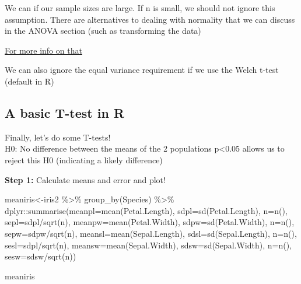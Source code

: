\documentclass[
  letterpaper,
  DIV=11,
  numbers=noendperiod]{scrartcl}
\newenvironment{Shaded}{\begin{snugshade}}{\end{snugshade}}
\newcommand{\AttributeTok}[1]{\textcolor[rgb]{0.40,0.45,0.13}{#1}}
\newcommand{\FunctionTok}[1]{\textcolor[rgb]{0.28,0.35,0.67}{#1}}
\newcommand{\NormalTok}[1]{\textcolor[rgb]{0.00,0.23,0.31}{#1}}
\newcommand{\OtherTok}[1]{\textcolor[rgb]{0.00,0.23,0.31}{#1}}
\newcommand{\SpecialCharTok}[1]{\textcolor[rgb]{0.37,0.37,0.37}{#1}}
\begin{document}
We can if our sample sizes are large. If n is small, we should not
ignore this assumption. There are alternatives to dealing with normality
that we can discuss in the ANOVA section (such as transforming the data)

\href{https://thestatsgeek.com/2013/09/28/the-t-test-and-robustness-to-non-normality/}{For
more info on that}

We can also ignore the equal variance requirement if we use the Welch
t-test (default in R)\\

\hypertarget{a-basic-t-test-in-r}{%
\subsection{\texorpdfstring{\textbf{A basic T-test in
R}}{A basic T-test in R}}\label{a-basic-t-test-in-r}}

Finally, let's do some T-tests!\\

H0: No difference between the means of the 2 populations p\textless0.05
allows us to reject this H0 (indicating a likely difference)

\textbf{Step 1:} Calculate means and error and plot!

\begin{Shaded}
\begin{Highlighting}[]
\NormalTok{meaniris}\OtherTok{\textless{}{-}}\NormalTok{iris2 }\SpecialCharTok{\%\textgreater{}\%}
  \FunctionTok{group\_by}\NormalTok{(Species) }\SpecialCharTok{\%\textgreater{}\%}
\NormalTok{  dplyr}\SpecialCharTok{::}\FunctionTok{summarise}\NormalTok{(}\AttributeTok{meanpl=}\FunctionTok{mean}\NormalTok{(Petal.Length), }\AttributeTok{sdpl=}\FunctionTok{sd}\NormalTok{(Petal.Length), }\AttributeTok{n=}\FunctionTok{n}\NormalTok{(), }\AttributeTok{sepl=}\NormalTok{sdpl}\SpecialCharTok{/}\FunctionTok{sqrt}\NormalTok{(n), }\AttributeTok{meanpw=}\FunctionTok{mean}\NormalTok{(Petal.Width), }\AttributeTok{sdpw=}\FunctionTok{sd}\NormalTok{(Petal.Width), }\AttributeTok{n=}\FunctionTok{n}\NormalTok{(), }\AttributeTok{sepw=}\NormalTok{sdpw}\SpecialCharTok{/}\FunctionTok{sqrt}\NormalTok{(n), }\AttributeTok{meansl=}\FunctionTok{mean}\NormalTok{(Sepal.Length), }\AttributeTok{sdsl=}\FunctionTok{sd}\NormalTok{(Sepal.Length), }\AttributeTok{n=}\FunctionTok{n}\NormalTok{(), }\AttributeTok{sesl=}\NormalTok{sdpl}\SpecialCharTok{/}\FunctionTok{sqrt}\NormalTok{(n), }\AttributeTok{meansw=}\FunctionTok{mean}\NormalTok{(Sepal.Width), }\AttributeTok{sdsw=}\FunctionTok{sd}\NormalTok{(Sepal.Width), }\AttributeTok{n=}\FunctionTok{n}\NormalTok{(), }\AttributeTok{sesw=}\NormalTok{sdsw}\SpecialCharTok{/}\FunctionTok{sqrt}\NormalTok{(n))}

\NormalTok{meaniris}
\end{Highlighting}
\end{Shaded}
\end{document}
